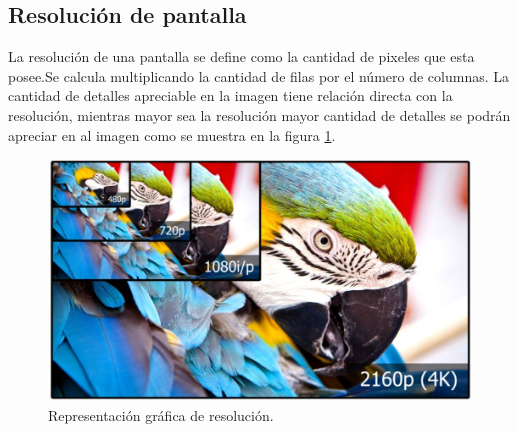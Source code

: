 
\subsection{Resolución de pantalla}
La resolución de una pantalla se define como la cantidad de pixeles que esta posee.Se calcula multiplicando la cantidad de filas por el número de columnas\citep{WIKIRESOL}. La cantidad de detalles apreciable en la imagen tiene relación directa con la resolución, mientras mayor sea la resolución mayor cantidad de detalles se podrán apreciar en al imagen como se muestra en la figura \ref{fig:grafresolucion}.
\begin{figure}[htpb]
	\centering
	\includegraphics[scale=0.3]{Figures/resolucion.jpg} 
	\caption{Representación gráfica de resolución\protect\footnotemark.}
	\label{fig:grafresolucion}
\end{figure}



